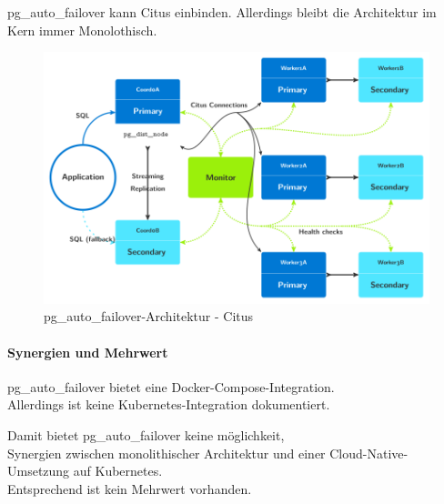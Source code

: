 \begin{flushleft}
    pg\_auto\_failover kann Citus einbinden\cite{3FVHLIFE}.
    Allerdings bleibt die Architektur im Kern immer Monolothisch.
    \begin{figure}[H]
        \centering
        \includegraphics[width=0.75\linewidth]{source/implementation/evaluation/postgresql_ha_solutions/pg_auto_failover/pg_auto-failover_arch-citus}
        \caption{pg\_auto\_failover-Architektur - Citus}
        \label{fig:pg_auto-failover_arch-citus}
    \end{figure}
\end{flushleft}
\begin{flushleft}
    \paragraph{Synergien und Mehrwert}
    pg\_auto\_failover bietet eine Docker-Compose-Integration.\\
    Allerdings ist keine Kubernetes-Integration dokumentiert.
\end{flushleft}
\begin{flushleft}
    Damit bietet pg\_auto\_failover keine möglichkeit,\\
    Synergien zwischen monolithischer Architektur und einer Cloud-Native-Umsetzung auf Kubernetes.\\
    Entsprechend ist kein Mehrwert vorhanden.
\end{flushleft}
